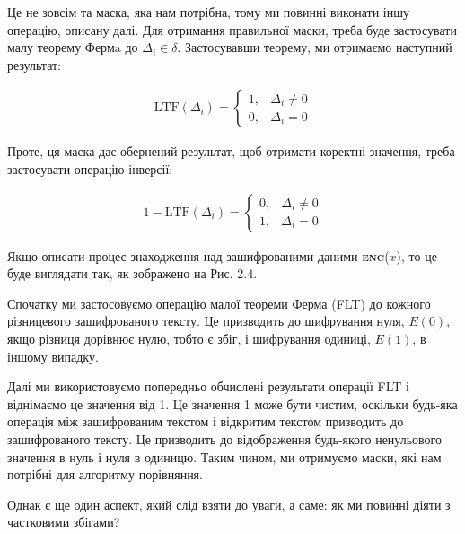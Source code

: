 \begin{itemize}
{Це не зовсім та маска, яка нам потрібна, тому ми повинні виконати іншу операцію, описану далі.
Для отримання правильної маски, треба буде застосувати малу теорему Фермa  \cite{Fermat} до
\(\Delta_i \in \delta\). Застосувавши теорему, ми отримаємо наступний результат:

\begin{align*}
\text{LTF}(\Delta_i) =
\begin{cases} 
    1, & \Delta_i \neq 0 \\
    0, & \Delta_i = 0
\end{cases}
\end{align*}

Проте, ця маска дає обернений результат, щоб отримати коректні значення, треба застосувати
операцію інверсії:

\begin{align*}
1- \text{LTF}(\Delta_i) =
\begin{cases} 
    0, & \Delta_i \neq 0 \\
    1, & \Delta_i = 0
\end{cases}
\end{align*}

Якщо описати процес знаходження над зашифрованими даними \textsc{\textbf{enc}}(\(x\)), то це
буде виглядати так, як зображено на Рис. 2.4.

Спочатку ми застосовуємо операцію малої теореми Ферма (FLT) \cite{Fermat} до кожного різницевого
зашифрованого тексту. Це призводить до шифрування нуля, \(E(0)\), якщо різниця дорівнює нулю,
тобто є збіг, і шифрування одиниці, \(E(1)\), в іншому випадку.

Далі ми використовуємо попередньо обчислені результати операції FLT і віднімаємо це значення від
1. Це значення 1 може бути чистим, оскільки будь-яка операція між зашифрованим текстом і
відкритим текстом призводить до зашифрованого тексту. Це призводить до відображення будь-якого
ненульового значення в нуль і нуля в одиницю. Таким чином, ми отримуємо маски, які нам потрібні
для алгоритму порівняння. 

Однак є ще один аспект, який слід взяти до уваги, а саме: як ми повинні діяти з частковими збігами?

}
\end{itemize}

